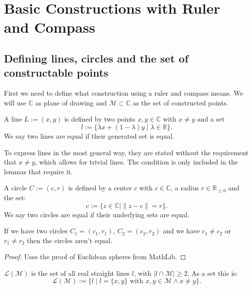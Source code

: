 \chapter{Basic Constructions with Ruler and Compass}

\section{Defining lines, circles and the set of constructable points}
First we need to define what construction using a ruler and compass means.
We will use $\mathbb{C}$ as plane of drawing and $\mathcal{M} \subset \mathbb{C}$ as the set of constructed points.

\begin{definition}[Line]
    \label{def:line}
    \leanok
    A line $L := (x,y)$ is defined by two points $x,y\in\mathbb{C}$ with $x\ne y$ and a set $$l:=\{\lambda x+(1-\lambda)y\mid\lambda\in\mathbb{R}\}.$$
    We say two lines are equal if their generated set is equal.
\end{definition}
\begin{remark}
    To express lines in the most general way, they are stated without the requirement that $x\ne y$, which allows for trivial lines. 
    The condition is only included in the lemmas that require it.
\end{remark}


\begin{definition}[Circle]
    \label{def:circle}
    \leanok
    A circle $C := (c,r)$ is defined by a center $c$ with  $c\in\mathbb{C}$, a radius $r\in\mathbb{R}_{\ge 0}$ and the set: $$c:=\{z\in\mathbb{C} \mid\|z-c\|=r\}.$$ 
    We say two circles are equal if their underlying sets are equal.
\end{definition}

\begin{lemma}
    \label{lem:circle_not_eq_iff}
    \leanok
    If we have two circles $C_1 = (c_1,r_1)$, $C_2 = (c_2,r_2)$ and we have $c_1 \ne c_2$ or $r_1  \ne r_2 $ then the circles aren't equal. 
\end{lemma}
\begin{proof}
    \leanok
    Uses the proof of Euclidean spheres from MathLib.
\end{proof}


\begin{definition}
    \label{def:set_of_lines}
    \leanok
    $\mathcal{L(M)}$ is the set of all real straight lines $l$, with $| l\cap \mathcal{M} |\ge 2$. As a set this is:
    \begin{equation*}
        \mathcal{L(M)} := \{l \mid l = \{x,y\} \text{ with }x,y \in \mathcal{M} \land x \neq y\}.
    \end{equation*}
\end{definition}


